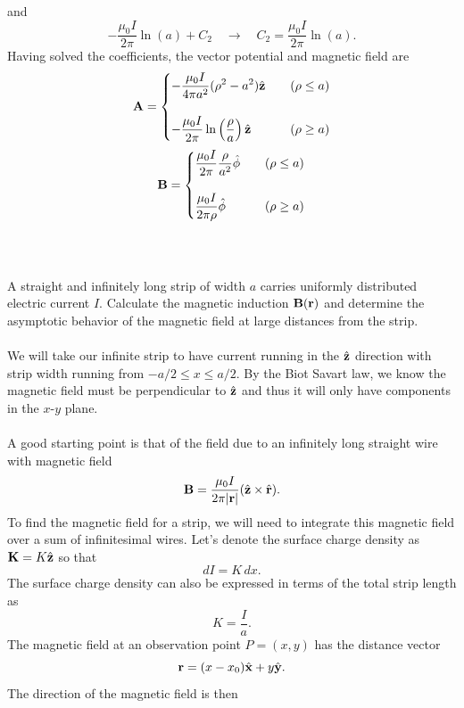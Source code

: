 \documentclass[11pt,letterpaper]{article}
\begin{document}
	and
	\[
		-\frac{\mu_0 I}{2\pi}\ln(a)+C_2\quad\to\quad C_2= \frac{\mu_0 I}{2\pi}\ln(a).
	\]
	Having solved the coefficients, the vector potential and magnetic field are
	\[
		\mathbf{A} = \begin{cases} \displaystyle -\frac{\mu_0 I}{4\pi a^2}(\rho^2-a^2)\hat{\mathbf{z}}&\quad(\rho\le a)\\ \\ \displaystyle
					-\frac{\mu_0 I}{2\pi}\ln\left(\frac{\rho}{a}\right)\hat{\mathbf{z}}&\quad(\rho\ge a)
				\end{cases}
	\]
	\[
		\mathbf{B} = \begin{cases}\displaystyle \frac{\mu_0 I}{2\pi}\frac{\rho}{a^2}\hat{\mathbf{\phi}} &\quad (\rho \le a)\\  \\\displaystyle
				 \frac{\mu_0 I}{2\pi\rho}\hat{\mathbf{\phi}}&\quad(\rho \ge a)
				\end{cases}
	\]
	\\
	\\
	\item
	A straight and infinitely long strip of width $a$ carries uniformly distributed electric current $I$. Calculate the magnetic 
	induction $\mathbf{B}(\mathbf{r})$ and determine the asymptotic behavior of the magnetic field at large distances from the strip.
	\\
	\\
	We will take our infinite strip to have current running in the $\hat{\mathbf{z}}$  direction with strip width running from $-a/2\le x \le a/2$. By the 
	Biot Savart law, we know the magnetic field must be perpendicular to $\hat{\mathbf{z}}$ and thus it will only have components in the $x$-$y$ 
	plane. 
	\\
	\\
	A good starting point is that of the field due to an infinitely long straight wire with magnetic field
	\[
		\mathbf{B} = \frac{\mu_0 I}{2\pi |\mathbf{r}|}(\hat{\mathbf{z}} \times \hat{\mathbf{r}}).
	\]
	To find the magnetic field for a strip, we will need to integrate this magnetic field over a sum of infinitesimal wires. Let's denote the
	surface charge density as $\mathbf{K} = K\hat{\mathbf{z}}$ so that
	\[
		dI = K\,dx.
	\]
	The surface charge density can also be expressed in terms of the total strip length as
	\[
		K = \frac{I}{a}.
	\]
	The magnetic field at an observation point $P = (x,y)$ has the distance vector 
	\[
		\mathbf{r} = (x-x_0)\hat{\mathbf{x}} + y \hat{\mathbf{y}}.
	\]
	The direction of the magnetic field is then
\end{document}
